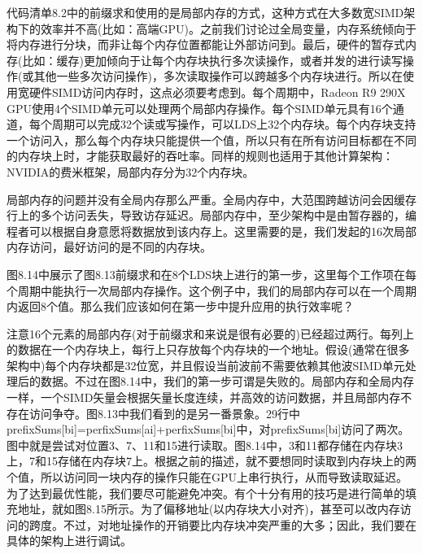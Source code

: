 
代码清单8.2中的前缀求和使用的是局部内存的方式，这种方式在大多数宽SIMD架构下的效率并不高(比如：高端GPU)。之前我们讨论过全局变量，内存系统倾向于将内存进行分块，而非让每个内存位置都能让外部访问到。最后，硬件的暂存式内存(比如：缓存)更加倾向于让每个内存块执行多次读操作，或者并发的进行读写操作(或其他一些多次访问操作)，多次读取操作可以跨越多个内存块进行。所以在使用宽硬件SIMD访问内存时，这点必须要考虑到。每个周期中，Radeon R9 290X GPU使用4个SIMD单元可以处理两个局部内存操作。每个SIMD单元具有16个通道，每个周期可以完成32个读或写操作，可以LDS上32个内存块。每个内存块支持一个访问入，那么每个内存块只能提供一个值，所以只有在所有访问目标都在不同的内存块上时，才能获取最好的吞吐率。同样的规则也适用于其他计算架构：NVIDIA的费米框架，局部内存分为32个内存块。

局部内存的问题并没有全局内存那么严重。全局内存中，大范围跨越访问会因缓存行上的多个访问丢失，导致访存延迟。局部内存中，至少架构中是由暂存器的，编程者可以根据自身意愿将数据放到该内存上。这里需要的是，我们发起的16次局部内存访问，最好访问的是不同的内存块。

图8.14中展示了图8.13前缀求和在8个LDS块上进行的第一步，这里每个工作项在每个周期中能执行一次局部内存操作。这个例子中，我们的局部内存可以在一个周期内返回8个值。那么我们应该如何在第一步中提升应用的执行效率呢？

注意16个元素的局部内存(对于前缀求和来说是很有必要的)已经超过两行。每列上的数据在一个内存块上，每行上只存放每个内存块的一个地址。假设(通常在很多架构中)每个内存块都是32位宽，并且假设当前波前不需要依赖其他波SIMD单元处理后的数据。不过在图8.14中，我们的第一步可谓是失败的。局部内存和全局内存一样，一个SIMD矢量会根据矢量长度连续，并高效的访问数据，并且局部内存不存在访问争夺。图8.13中我们看到的是另一番景象。29行中prefixSums[bi]=perfixSums[ai]+perfixSums[bi]中，对prefixSums[bi]访问了两次。图中就是尝试对位置3、7、11和15进行读取。图8.14中，3和11都存储在内存块3上，7和15存储在内存块7上。根据之前的描述，就不要想同时读取到内存块上的两个值，所以访问同一块内存的操作只能在GPU上串行执行，从而导致读取延迟。为了达到最优性能，我们要尽可能避免冲突。有个十分有用的技巧是进行简单的填充地址，就如图8.15所示。为了偏移地址(以内存块大小对齐)，甚至可以改内存访问的跨度。不过，对地址操作的开销要比内存块冲突严重的大多；因此，我们要在具体的架构上进行调试。


